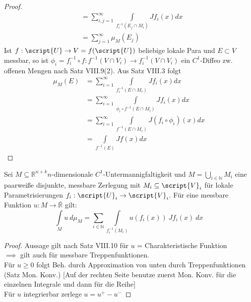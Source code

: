 \begin{proof}
\begin{align*}
		&= \sum\limits_{i,j=1}^\infty \int\limits_{f_i^{-1}(E_j\cap M_i)} Jf_i(x)dx \\
			&= \sum\limits_{j=1}^\infty \mu_M(E_j)
	\end{align*}
	Ist $f:\script{U} \to V = f(\script{U})$ beliebige lokale Para und $E\subset V$ messbar, so ist $\phi_i = f_i^{-1}\circ f: f^{-1}(V\cap V_i) \to f_i^{-1}(V\cap V_i)$ ein $C^1$-Diffeo zw. offenen Mengen nach Satz VIII.9(2). Aus Satz VIII.3 folgt \begin{align*}
		\mu_M(E) &= \sum\limits_{i=1}^\infty \int\limits_{f_i^{-1}(E\cap M_i)} Jf_i(x) dx \\
		&= \sum\limits_{i=1}^\infty \int\limits_{\phi_i\circ f^{-1}(E\cap M_i)} Jf_i(x) dx \\
		&= \sum\limits_{i=1}^\infty \int\limits_{f^{-1}(E\cap M_i)}J(f_i\circ\phi_i)(x) dx \\
		&= \int\limits_{f^{-1}(E)} Jf(x) dx
	\end{align*}

  \end{proof}
	\newpage
  \begin{theorem}[Oberflächenintegral]
    Sei $M \subseteq \mathbb{R}^{n+k} n$-dimensionale $C^1$-Untermannigfaltigkeit und $M = \bigcup\limits_{i \in \mathbb{N}} M_i$ eine paarweiße disjunkte, messbare Zerlegung mit $M_i \subseteq \script{V}_i$ für lokale Parametrisierungen $f_i: \script{U}_i \to \script{V}_i$. Für eine messbare Funktion $u: M \to \bar{\mathbb{R}}$ gilt:
    $$\int\limits_M u \ d\mu_M = \sum\limits_{i \in \mathbb{N}} \int\limits_{f_i^{-1}(M_i)} u(f_i(x))\ Jf_i(x)\ dx$$
  \end{theorem}
  \begin{proof}
  	Aussage gilt nach Satz VIII.10 für $u$ = Charakteristische Funktion\\  $\implies$ gilt auch für messbare Treppenfunktionen. \\
  	Für $u\geq 0$ folgt Beh. durch Approximation von unten durch Treppenfunktionen (Satz Mon. Konv.) [Auf der rechten Seite benutze zuerst Mon. Konv. für die einzelnen Integrale und dann für die Reihe] \\ Für $u$ integrierbar zerlege $u = u^+ - u^-$
  \end{proof}

